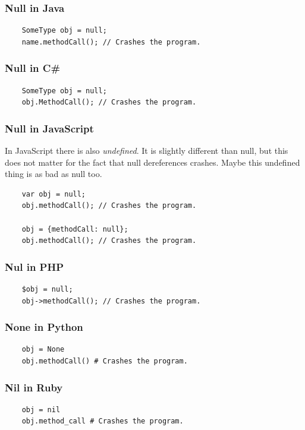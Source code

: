 \documentclass[12pt,a4paper]{report}
\begin{document}
\subsubsection{Null in Java}
\begin{verbatim}
    SomeType obj = null;
    name.methodCall(); // Crashes the program.
\end{verbatim}

\subsubsection{Null in C\#}
\begin{verbatim}
    SomeType obj = null;
    obj.MethodCall(); // Crashes the program.
\end{verbatim}

\subsubsection{Null in JavaScript}
In JavaScript there is also \textit{undefined}. It is slightly different than null, but this does not matter for the fact that null dereferences crashes. Maybe this undefined thing is as bad as null too.

\begin{verbatim}
    var obj = null;
    obj.methodCall(); // Crashes the program.

    obj = {methodCall: null};
    obj.methodCall(); // Crashes the program.
\end{verbatim}

\subsubsection{Nul in PHP}
\begin{verbatim}
    $obj = null;
    obj->methodCall(); // Crashes the program.    
\end{verbatim}

\subsubsection{None in Python}
\begin{verbatim}
    obj = None
    obj.methodCall() # Crashes the program.
\end{verbatim}

\subsubsection{Nil in Ruby}
\begin{verbatim}
    obj = nil
    obj.method_call # Crashes the program.
\end{verbatim}
\end{document}
